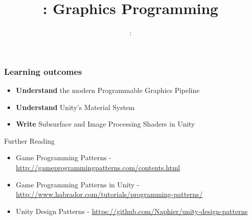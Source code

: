 \usepackage{../../beamerthemeFalmouthGamesAcademy}
\usepackage{multimedia}
\graphicspath{ {../../} }


\usepackage[normalem]{ulem}
\usepackage{wasysym}

\usepackage{pdfpages}

\usetikzlibrary{arrows,automata}




\title{\sessionnumber: Graphics Programming}
\subtitle{\modulecode: \moduletitle}

\frame{\titlepage} 

\begin{frame}
	\frametitle{Learning outcomes}
	\begin{itemize}
		\item \textbf{Understand} the modern Programmable Graphics Pipeline
		\item \textbf{Understand} Unity's Material System
		\item \textbf{Write} Subsurface and Image Processing Shaders in Unity
	\end{itemize}
\end{frame}






\begin{frame}{Further Reading}
	\begin{itemize}
		\item Game Programming Patterns - \url{http://gameprogrammingpatterns.com/contents.html}
		\item Game Programming Patterns in Unity - \url{http://www.habrador.com/tutorials/programming-patterns/}
		\item Unity Design Patterns - \url{https://github.com/Naphier/unity-design-patterns}
	\end{itemize}
\end{frame}
